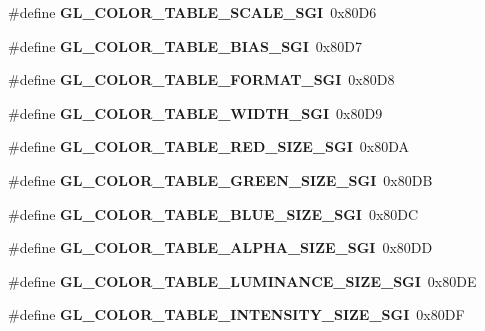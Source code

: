 \begin{DoxyCompactItemize}
\item 
\#define {\bfseries G\+L\+\_\+\+C\+O\+L\+O\+R\+\_\+\+T\+A\+B\+L\+E\+\_\+\+S\+C\+A\+L\+E\+\_\+\+S\+G\+I}~0x80\+D6\label{_s_d_l__opengl_8h_a41d6f6af001ccd634c487e2b92980d37}

\item 
\#define {\bfseries G\+L\+\_\+\+C\+O\+L\+O\+R\+\_\+\+T\+A\+B\+L\+E\+\_\+\+B\+I\+A\+S\+\_\+\+S\+G\+I}~0x80\+D7\label{_s_d_l__opengl_8h_a92ae56459d4533c9e90ae5c63903f7de}

\item 
\#define {\bfseries G\+L\+\_\+\+C\+O\+L\+O\+R\+\_\+\+T\+A\+B\+L\+E\+\_\+\+F\+O\+R\+M\+A\+T\+\_\+\+S\+G\+I}~0x80\+D8\label{_s_d_l__opengl_8h_a905c13639d320b93c084df3b49d44cac}

\item 
\#define {\bfseries G\+L\+\_\+\+C\+O\+L\+O\+R\+\_\+\+T\+A\+B\+L\+E\+\_\+\+W\+I\+D\+T\+H\+\_\+\+S\+G\+I}~0x80\+D9\label{_s_d_l__opengl_8h_a1be5c448fbe5ad596fff9ad6b40e4419}

\item 
\#define {\bfseries G\+L\+\_\+\+C\+O\+L\+O\+R\+\_\+\+T\+A\+B\+L\+E\+\_\+\+R\+E\+D\+\_\+\+S\+I\+Z\+E\+\_\+\+S\+G\+I}~0x80\+D\+A\label{_s_d_l__opengl_8h_a68f8e77dea1fe0d10d8b153f55d8396b}

\item 
\#define {\bfseries G\+L\+\_\+\+C\+O\+L\+O\+R\+\_\+\+T\+A\+B\+L\+E\+\_\+\+G\+R\+E\+E\+N\+\_\+\+S\+I\+Z\+E\+\_\+\+S\+G\+I}~0x80\+D\+B\label{_s_d_l__opengl_8h_a8557d1d60b7b3d893f9e0aa25c9396d5}

\item 
\#define {\bfseries G\+L\+\_\+\+C\+O\+L\+O\+R\+\_\+\+T\+A\+B\+L\+E\+\_\+\+B\+L\+U\+E\+\_\+\+S\+I\+Z\+E\+\_\+\+S\+G\+I}~0x80\+D\+C\label{_s_d_l__opengl_8h_a84274112ddefcf05bca7b24e4a541fa2}

\item 
\#define {\bfseries G\+L\+\_\+\+C\+O\+L\+O\+R\+\_\+\+T\+A\+B\+L\+E\+\_\+\+A\+L\+P\+H\+A\+\_\+\+S\+I\+Z\+E\+\_\+\+S\+G\+I}~0x80\+D\+D\label{_s_d_l__opengl_8h_a81aeeb0ee3492e0f53a6910711a71548}

\item 
\#define {\bfseries G\+L\+\_\+\+C\+O\+L\+O\+R\+\_\+\+T\+A\+B\+L\+E\+\_\+\+L\+U\+M\+I\+N\+A\+N\+C\+E\+\_\+\+S\+I\+Z\+E\+\_\+\+S\+G\+I}~0x80\+D\+E\label{_s_d_l__opengl_8h_a468f677e40ea12ca23d2597f6c8ead86}

\item 
\#define {\bfseries G\+L\+\_\+\+C\+O\+L\+O\+R\+\_\+\+T\+A\+B\+L\+E\+\_\+\+I\+N\+T\+E\+N\+S\+I\+T\+Y\+\_\+\+S\+I\+Z\+E\+\_\+\+S\+G\+I}~0x80\+D\+F\label{_s_d_l__opengl_8h_aafcdbd69fe615f0b50c898771513a8ba}


\end{DoxyCompactItemize}
